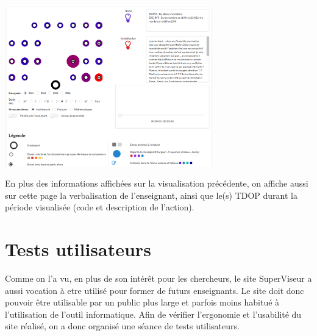\documentclass{article}
\begin{document}
\begin{itemize}
        \begin{center}
            \includegraphics[height=7cm]{rep_spatiale.png}
        \end{center}
        En plus des informations affichées sur la visualisation précédente, on affiche aussi sur cette page la verbalisation de l'enseignant, ainsi que le(s) TDOP durant la période visualisée (code et description de l'action).
\end{itemize}

\section{Tests utilisateurs}
Comme on l'a vu, en plus de son intérêt pour les chercheurs, le site SuperViseur a aussi vocation à etre utilisé pour former de futurs enseignants. Le site doit donc pouvoir être utilisable par un public plus large et parfois moins habitué à l'utilisation de l'outil informatique. Afin de vérifier l'ergonomie et l'usabilité du site réalisé, on a donc organisé une séance de tests utilisateurs.
\end{document}
